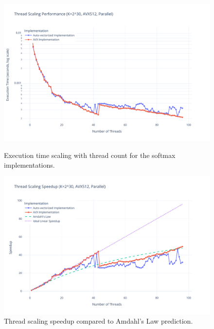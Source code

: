 \documentclass[10pt]{report}
\begin{document}
\begin{figure}[H]
  \centering
  \begin{minipage}{0.49\textwidth}
    \centering
    \includegraphics[width=\textwidth]{../images/thread_scaling/thread_scaling_avx512.pdf}
    \caption{Execution time scaling with thread count for the softmax implementations.}
    \label{fig:thread_scaling}
  \end{minipage}
  \hfill
  \begin{minipage}{0.49\textwidth}
    \centering
    \includegraphics[width=\textwidth]{../images/thread_scaling/thread_scaling_speedup_avx512.pdf}
    \caption{Thread scaling speedup compared to Amdahl's Law prediction.}
    \label{fig:thread_speedup}
  \end{minipage}
\end{figure}
\end{document}
